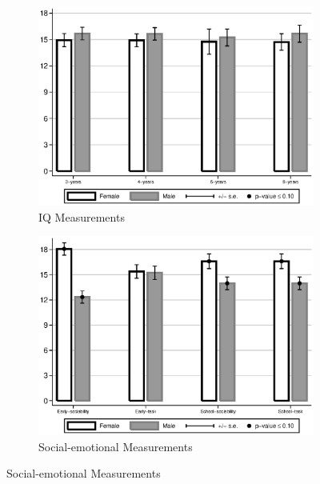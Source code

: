 \begin{figure}
\begin{center}
\caption{Mean Differences between Males and Females, Skills}
\label{fig:intro-skills-plots}
\begin{subfigure}[b]{0.49\textwidth}
	\caption{IQ Measurements}
	\label{fig:intro-skills-plots-cog}
	\includegraphics[width=\textwidth]{../output/abccare-gdiff-cog}
\end{subfigure}
\begin{subfigure}[b]{0.49\textwidth}
	\caption{Social-emotional Measurements}
	\label{fig:intro-skills-plots-ncog}
	\includegraphics[width=\textwidth]{../output/abccare-gdiff-ncog}
\end{subfigure}


\end{center}
\end{figure}
